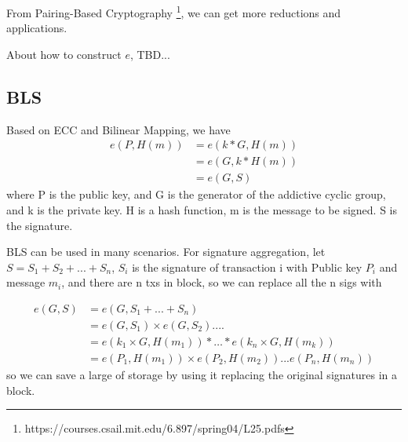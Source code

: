 \documentclass[a4paper,11pt]{article}
\begin{document}
From Pairing-Based Cryptography \footnote{https://courses.csail.mit.edu/6.897/spring04/L25.pdfs}, we can get more reductions and applications.

About how to construct $e$,   TBD...
 

\subsection {BLS}
Based on ECC and Bilinear Mapping, we have 
\begin{equation}
\begin{split}
e(P, H(m)) &= e(k * G, H(m))  \\
    &= e(G, k*H(m))   \\
    &= e(G, S) 
\end{split}
\end{equation}
where P is the public key, and G is the generator of the addictive cyclic group, and k is the private key.  H is a hash function, m is the message to be signed.  S is the signature.

BLS can be used in many scenarios. 
For signature aggregation,   let $S = S_1 + S_2 + ... + S_n$, $S_i$ is the signature of transaction i with Public key $P_i$ and message $m_i$, and there are n txs in block, so we can replace all the n sigs with

\begin{equation}
\begin{split}
e(G, S) &=  e(G, S_1 + ... +S_n)  \\
&= e(G, S_1) \times e(G, S_2) .... \\
&= e(k_1 \times  G, H(m_1)) *…* e(k_n \times G, H(m_k)) \\
&= e(P_1, H(m_1)) \times  e(P_2, H(m_2)) ... e(P_n, H(m_n))
\end{split}
\end{equation}
so we can save a large of storage by using it replacing the original signatures in a block.
\end{document}
